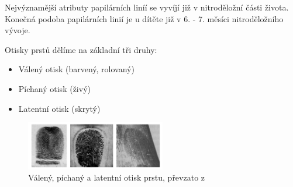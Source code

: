 Nejvýznamější atributy papilárních liníí se vyvíjí již v nitroděložní části života. Konečná podoba papilárních linií je u dítěte již v 6. - 7. měsíci nitroděložního vývoje.\cite{DrahanskyBrezinova}

Otisky prstů dělíme na základní tři druhy:\cite{Drahansky}
\begin{itemize}
\item Válený otisk (barvený, rolovaný)
\item Píchaný otisk (živý)
\item Latentní otisk (skrytý)
\end{itemize}

\begin{figure}[!htbp]
    \centering
    \includegraphics[width=230px]{obrazky-figures/druhyotisk.png}
    \caption{Válený, píchaný a latentní otisk prstu, převzato z \cite{Drahansky}}
\end{figure}

